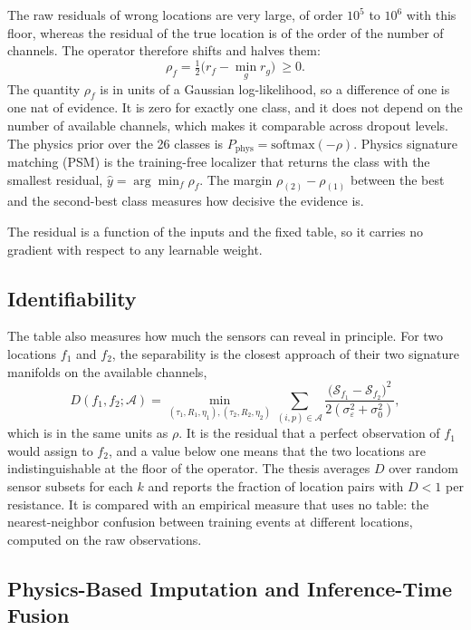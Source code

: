 \documentclass[MTech]{ugthesis}
\begin{document}
The raw residuals of wrong locations are very large, of order $10^5$ to $10^6$ with this floor, whereas the residual of the true location is of the order of the number of channels. The operator therefore shifts and halves them:
\begin{equation}
\rho_f=\tfrac{1}{2}\big(r_f-\min_{g}r_g\big)\ \ge 0 .
\label{eq:rho}
\end{equation}
The quantity $\rho_f$ is in units of a Gaussian log-likelihood, so a difference of one is one nat of evidence. It is zero for exactly one class, and it does not depend on the number of available channels, which makes it comparable across dropout levels. The physics prior over the 26 classes is $P_{\mathrm{phys}}=\mathrm{softmax}(-\rho)$. Physics signature matching (\ac{PSM}) is the training-free localizer that returns the class with the smallest residual, $\hat{y}=\arg\min_f\rho_f$. The margin $\rho_{(2)}-\rho_{(1)}$ between the best and the second-best class measures how decisive the evidence is.

The residual is a function of the inputs and the fixed table, so it carries no gradient with respect to any learnable weight.

\subsection{Identifiability}

The table also measures how much the sensors can reveal in principle. For two locations $f_1$ and $f_2$, the separability is the closest approach of their two signature manifolds on the available channels,
\begin{equation}
D(f_1,f_2;\mathcal{A})=\min_{(\tau_1,R_1,\eta_1),(\tau_2,R_2,\eta_2)}\sum_{(i,p)\in\mathcal{A}}\frac{\big(\mathcal{S}_{f_1}-\mathcal{S}_{f_2}\big)^2}{2(\sigma_\varepsilon^2+\sigma_0^2)} ,
\label{eq:sep}
\end{equation}
which is in the same units as $\rho$. It is the residual that a perfect observation of $f_1$ would assign to $f_2$, and a value below one means that the two locations are indistinguishable at the floor of the operator. The thesis averages $D$ over random sensor subsets for each $k$ and reports the fraction of location pairs with $D<1$ per resistance. It is compared with an empirical measure that uses no table: the nearest-neighbor confusion between training events at different locations, computed on the raw observations.

\subsection{Physics-Based Imputation and Inference-Time Fusion}
\end{document}
